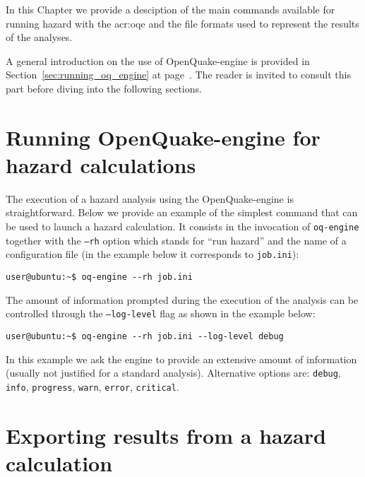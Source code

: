 In this Chapter we provide a desciption of the main commands available for
running hazard with the \gls{acr:oqe} and the file formats used to represent
the results of the analyses.

A general introduction on the use of OpenQuake-engine is provided in
Section~\ref{sec:running_oq_engine} at page~\pageref{sec:running_oq_engine}. The
reader is invited to consult this part before diving into the following
sections.


\section{Running OpenQuake-engine for hazard calculations}
\label{sec:running_hazard_calculations}

The execution of a hazard analysis using the OpenQuake-engine is
straightforward. Below we provide an example of the simplest command that can be
used to launch a hazard calculation. It consists in the invocation of \texttt
{oq-engine} together with the \texttt{--rh} option which stands for ``run
hazard'' and the name of a configuration file (in the example below it
corresponds to \texttt{job.ini}):

\begin{Verbatim}[frame=single, commandchars=\\\{\}, fontsize=\small]
user@ubuntu:~$ oq-engine --rh job.ini
\end{Verbatim}

The amount of information prompted during the execution of the analysis can be
controlled through the \texttt{--log-level} flag as shown in the example below:

\begin{Verbatim}[frame=single, commandchars=\\\{\}, fontsize=\small]
user@ubuntu:~$ oq-engine --rh job.ini --log-level debug
\end{Verbatim}

In this example we ask the engine to provide an extensive amount of information
(usually not justified for a standard analysis). Alternative options are:
\texttt{debug}, \texttt{info}, \texttt{progress}, \texttt{warn}, \texttt{error},
\texttt{critical}.


\section{Exporting results from a hazard calculation}
\label{sec:exporting_hazard_results}

